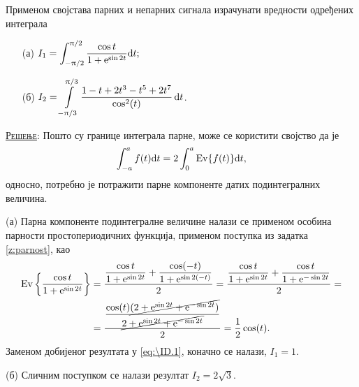 \PID 
Применом својстава парних и непарних 
сигнала
израчунати вредности 
одређених интеграла 
\begin{multicols}{2}
\begin{enumerate}

\item[(а)]
$\displaystyle 
I_1 = 
\int_{-\uppi/2}^{\uppi/2}
\dfrac{\cos t}{1 + {\rm e}^{\sin 2t}}
 {\rm d} t;
$

\item[(б)]
$\displaystyle
I_2 = \int\limits_{-\uppi/3}^{\uppi/3}
\dfrac{1 - t + 2t^3 - t^5 + 2t^7}{\cos^2 (t)}\,{\rm d} t$.
\end{enumerate}
\end{multicols}

\textsc{\underline{Решење}}:
Пошто су границе интеграла парне, може се користити својство да је 
\begin{equation}
\displaystyle \int_{-a}^{a} f(t) \de t = 2\int_{0}^{a} {\rm Ev}\{f(t)\} \de t, \label{eq:\ID.1}
\end{equation}
односно, потребно је потражити парне компоненте датих подинтегралних величина. 

(а) Парна компоненте подинтегралне величине налази се применом особина парности простопериодичних функција, 
применом поступка из задатка \ref{z:parnost}, као 
\begin{eqnarray}
    {\rm Ev}\left\{  
        \dfrac{\cos t}{1 + {\rm e}^{\sin 2t}}
    \right\}
    &= \dfrac{
        \dfrac{\cos t}{1 + {\rm e}^{\sin 2t}} + \dfrac{\cos (-t)}{1 + {\rm e}^{\sin 2(-t)}}
    }{2}
    =
    \dfrac{
        \dfrac{\cos t}{1 + {\rm e}^{\sin 2t}} + \dfrac{\cos t}{1 + {\rm e}^{-\sin 2t}}
    }{2}
    =  \\
    &= \dfrac{ \dfrac{\cos(t) \cancel{( 2 + {\rm e}^{\sin 2t} + {\rm e}^{-\sin 2t} )} } { \cancel{2 + {\rm e}^{\sin 2t} + {\rm e}^{-\sin 2t}} } }{2}
    = \dfrac{1}{2} \cos(t).
\end{eqnarray}
Заменом добијеног резултата у \eqref{eq:\ID.1}, коначно се налази, $I_1 = 1$.

(б) Сличним поступком се налази резултат $I_2 = 2\sqrt 3$.
